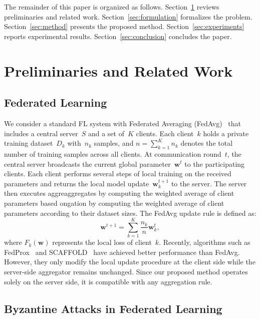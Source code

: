 \documentclass[journal]{IEEEtran}
\begin{document}
The remainder of this paper is organized as follows. Section~\ref{sec:preliminaries} reviews preliminaries and related work. Section~\ref{sec:formulation} formalizes the problem. Section~\ref{sec:method} presents the proposed method. Section~\ref{sec:experiments} reports experimental results. Section~\ref{sec:conclusion} concludes the paper.

\section{Preliminaries and Related Work}
\label{sec:preliminaries}

\subsection{Federated Learning}

We consider a standard FL system with Federated Averaging (FedAvg)~\cite{mcmahan2017communication} that includes a central server~$S$ and a set of~$K$ clients. Each client~$k$ holds a private training dataset~$D_k$ with~$n_k$ samples, and $n = \sum_{k=1}^{K} n_k$ denotes the total number of training samples across all clients. At communication round~$t$, the central server broadcasts the current global parameter~$\mathbf{w}^t$ to the participating clients. Each client performs several steps of local training on the received parameters and returns the local model update~$\mathbf{w}_k^{t+1}$ to the server. The server then executes aggreaggregates by computing the weighted average of client parameters based ongation by computing the weighted average of client parameters according to their dataset sizes. The FedAvg update rule is defined as:
\begin{equation}
\mathbf{w}^{t+1} = \sum_{k=1}^{K} \frac{n_k}{n} \mathbf{w}_k^t,
\label{eq:fedavg}
\end{equation}
where $F_k(\mathbf{w})$ represents the local loss of client~$k$. Recently, algorithms such as FedProx~\cite{li2020federated} and SCAFFOLD~\cite{karimireddy2021scaffold} have achieved better performance than FedAvg. However, they only modify the local update procedure at the client side while the server-side aggregator remains unchanged. Since our proposed method operates solely on the server side, it is compatible with any aggregation rule.

\subsection{Byzantine Attacks in Federated Learning}
\end{document}
